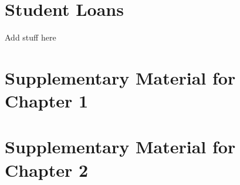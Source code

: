 \documentclass[12pt,letterpaper,oneside,final]{memoir}
\begin{document}
  
  
  
  
  


\chapter{Student Loans}

Add stuff here

\newpage
\clearpage

\begin{appendices}

\appendix
{}

\chapter{Supplementary Material for Chapter 1} \label{sec:Appendix1}

  
  

\chapter{Supplementary Material for Chapter 2} \label{sec:Appendix2}

  
  

\newpage
\clearpage

\end{appendices}

\newpage

\clearpage

\backmatter


  \begin{OnehalfSpace}
    
    
  \end{OnehalfSpace}
\end{document}
